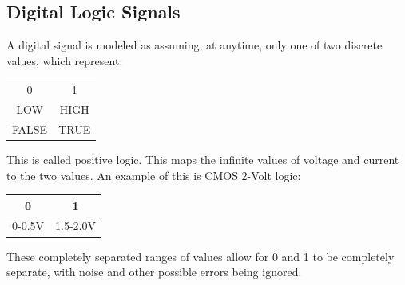 \documentclass[nobib]{tufte-handout}
\begin{document}
\subsection{Digital Logic Signals}
A digital signal is modeled as assuming, at anytime, only one of two discrete values, which represent:\\
\begin{table}
 \centering
    \begin{tabular}{c|c}
    0 & 1 \\
    LOW & HIGH \\
    FALSE & TRUE\\
    \end{tabular}
\end{table}
This is called positive logic.
This maps the infinite values of voltage and current to the two values.
An example of this is CMOS 2-Volt logic:\\
\begin{table}
 \centering
    \begin{tabular}{c|c}
    0 & 1 \\
    \hline
    0-0.5V & 1.5-2.0V \\
    \end{tabular}
\end{table}
These completely separated ranges of values allow for 0 and 1 to be completely separate, with noise and other possible errors being ignored.
\pagebreak
\end{document}
